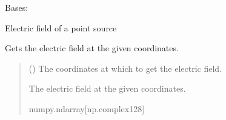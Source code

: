 \documentclass[letterpaper,10pt,english]{sphinxmanual}
\begin{document}

\begin{fulllineitems}
\label{\detokenize{source/Sources:Sources.PointSource}}
\pysigstartsignatures
\pysiglinewithargsret
{}
{\sphinxparamcomma {}}
{}
\pysigstopsignatures
\sphinxAtStartPar
Bases: {\hyperref[\detokenize{source/Sources:Sources.ElectricFieldSource}]{}}

\sphinxAtStartPar
Electric field of a point source


\begin{fulllineitems}
\label{\detokenize{source/Sources:Sources.PointSource.get_electric_field}}
\pysigstartsignatures
\pysiglinewithargsret
{}
{}
{}
\pysigstopsignatures
\sphinxAtStartPar
Gets the electric field at the given coordinates.
\begin{quote}\begin{description}
\sphinxAtStartPar
{} (\sphinxstyleliteralemphasis{\sphinxupquote{{[}}}\sphinxstyleliteralemphasis{\sphinxupquote{{]}}}) \textendash{} The coordinates at which to get the electric field.

\sphinxAtStartPar
The electric field at the given coordinates.

\sphinxAtStartPar
numpy.ndarray{[}np.complex128{]}

\end{description}\end{quote}

\end{fulllineitems}


\end{fulllineitems}
\end{document}
